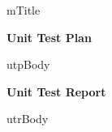 \documentclass[11pt]{article}
\begin{document}
	
{mTitle}

\setcounter{tocdepth}{3}
\setcounter{secnumdepth}{5}
\tableofcontents
\newpage

{\centering \textbf{\LARGE Unit Test Plan} \par}
\newpage
{utpBody}
\newpage

{\centering \textbf{\LARGE Unit Test Report} \par}
\newpage
{utrBody}	
\end{document}
